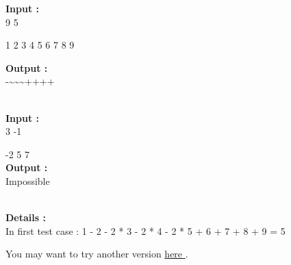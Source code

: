 \textbf{Input : }
\\9 5

1 2 3 4 5 6 7 8 9

\textbf{Output : }
\\-\textasciitilde\textasciitilde\textasciitilde++++


\\\textbf{Input : }
\\3 -1

-2 5 7
\\\textbf{Output : }
\\Impossible


\\\textbf{Details : }
\\In first test case : 1 - 2 - 2 * 3 - 2 * 4 - 2 * 5 + 6 + 7 + 8 + 9 = 5

You may want to try another version \href{/problems/show/BLOPER}{ here } .